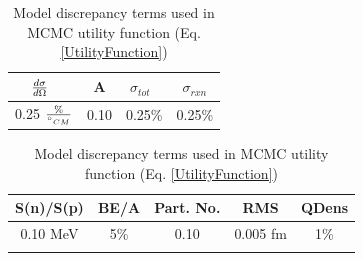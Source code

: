 \documentclass[twocolumn,secnumarabic,amssymb, nobibnotes, aps, prl,
superscriptaddress, nobalancelastpage]{revtex4}
\newcommand{\tot}{\ensuremath{\sigma_{tot}}}
\newcommand{\rxn}{\ensuremath{\sigma_{rxn}}}
\newcommand{\el}{\ensuremath{\frac{\lowercase{d}\sigma}{\lowercase{d}\Omega}}}
\begin{document}
\begin{table}[tb]
    \caption[Model discrepancy terms used in MCMC utility function (Eq.
    \ref{UtilityFunction})]
    {Model discrepancy terms used in MCMC utility function (Eq.
    \ref{UtilityFunction})}
    \label{ModelDiscrepancyTable}
    \centering
    \begin{tabular}{ c c c c }
        \hline
        \el\ & A & \tot\ & \rxn \\
        \hline
         0.25 $\frac{\%}{\degree_{CM}}$ & 0.10 & 0.25\% & 0.25\% \\
        \hline
    \end{tabular}

    \vfill

    \begin{tabular}{ c c c c c }
        \hline
        S(n)/S(p) & BE/A & Part. No. & RMS & QDens \\
        \hline
        0.10 MeV & 5\% & 0.10 & 0.005 fm & 1\% \\
        \\
        \hline
    \end{tabular}

\end{table}
\end{document}
